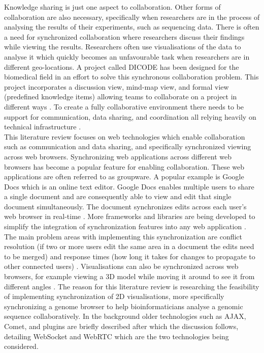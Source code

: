 \documentclass[prodmode,acmtecs]{acmsmall}
\begin{document}
Knowledge sharing is just one aspect to collaboration. Other forms of collaboration are also necessary, specifically when researchers are in the process of analysing the results of their experiments, such as sequencing data. There is often a need for synchronized collaboration where researchers discuss their findings while viewing the results. Researchers often use visualisations of the data to analyse it which quickly becomes an unfavourable task when researchers are in different geo-locations. A project called DICODE has been designed for the biomedical field in an effort to solve this synchronous collaboration problem. This project incorporates a discussion view, mind-map view, and formal view (predefined knowledge items) allowing teams to collaborate on a project in different ways \cite{karacapilidis2011facilitating}. To create a fully collaborative environment there needs to be support for communication, data sharing, and coordination all relying heavily on technical infrastructure \cite{lee2007facilitating}.\\

This literature review focuses on web technologies which enable collaboration such as communication and data sharing, and specifically synchronized viewing across web browsers. Synchronizing web applications across different web browsers has become a popular feature for enabling collaboration. These web applications are often referred to as groupware. A popular example is Google Docs which is an online text editor. Google Docs enables multiple users to share a single document and are consequently able to view and edit that single document simultaneously. The document synchronizes edits across each user's web browser in real-time \cite{koren2013shared}. More frameworks and libraries are being developed to simplify the integration of synchronization features into any web application \cite{ozono2012real}. The main problem areas with implementing this synchronization are conflict resolution (if two or more users edit the same area in a document the edits need to be merged) and response times (how long it takes for changes to propagate to other connected users) \cite{heinrich2012enriching}. Visualisations can also be synchronized across web browsers, for example viewing a 3D model while moving it around to see it from different angles \cite{marion2012real}. The reason for this literature review is researching the feasibility of implementing synchronization of 2D visualisations, more specifically synchronizing a genome browser to help bioinformaticians analyse a genomic sequence collaboratively. In the background older technologies such as AJAX, Comet, and plugins are briefly described after which the discussion follows, detailing WebSocket and WebRTC which are the two technologies being considered.  
\end{document}
